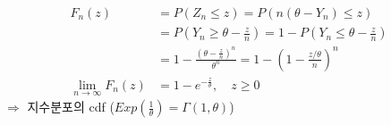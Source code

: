 \documentclass{oblivoir}
\begin{document}
\begin{itemize}
\begin{align*}
F_n(z) &= P(Z_n \leq z) = P(n(\theta - Y_n) \leq z) \\
&= P(Y_n \geq \theta - \frac{z}{n}) = 1-P(Y_n \leq \theta - \frac{z}{n}) \\
&= 1 -  \frac{\left(\theta - \frac{z}{n}\right)^n}{\theta^n} = 1 - (1 - \frac{z/\theta}{n})^n \\
\lim_{n \rightarrow \infty} F_n(z) &= 1 - e^{-\frac{z}{\theta}}, \quad z \geq 0
\end{align*}
$\Rightarrow$ 지수분포의 cdf ($Exp\left(\frac{1}{\theta}\right) = \Gamma(1,\theta)$)














\end{itemize}
\end{document}
